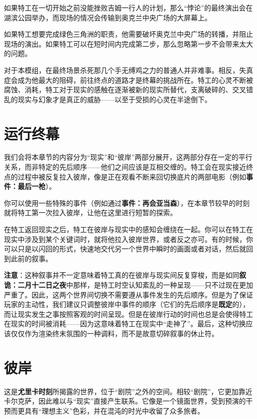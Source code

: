 如果特工在一切开始之前没能挫败吉姆一行人的计划，那么“悖论”的最终演出会在湖滨公园举办，而现场的情况会传输到奥克兰中央广场的大屏幕上。

如果特工想要完成绿色三角洲的职责，他需要破坏奥克兰中央广场的转播，并阻止现场的演出。如果特工可以在短时间内完成第二步，那么忽略第一步不会带来太大的问题。

对于本模组，在最终场景杀死那几个手无缚鸡之力的普通人并非难事。相反，失真症会成为他最大的阻碍，前往终点的道路才是终幕的挑战所在。特工的心灵不断被腐蚀、消耗，特工对于现实的感触在逐渐被新的现实所替代，支离破碎的、交叉错乱的现实与幻象才是真正的威胁——以至于受损的心灵在半途倒下。

\section{运行终幕}

我们会将本章节的内容分为“现实”和“彼岸”两部分展开，这两部分存在一定的平行关系，而非特定的先后顺序——他们之间应该是互相交缠的。特工会在现实接近终点的过程中被反复拉入彼岸，像是正在观看不断来回切换底片的两部电影（例如\textbf{事件：最后一枪}）。

你可以使用一些特殊的事件（例如通过\textbf{事件：再会亚当森}），在本章节较早的时刻就将特工第一次拉入彼岸，让他在这里进行短暂的探索。

在特工返回现实之后，特工在彼岸与现实中的感知会缠绕在一起。你可以在特工在现实中涉及到某个关键词时，就将他拉入彼岸世界，或者反之亦可。有的时候，你可以只是以闪回的形式，快速地交代另一个世界中瞬时的画面或者对话，然后就回到此前的叙事。

\textbf{注意}：这种叙事并不一定意味着特工真的在彼岸与现实间反复穿梭，而是如同\textbf{叙诡：二月十二日之夜}中那样，是特工时空认知紊乱的一种呈现——只不过现在更加严重了。因此，这两个世界间切换不需要遵从事件发生的先后顺序。但是为了保证玩家的主动性，我们建议只调整彼岸中事件的顺序（它们的先后顺序是\textbf{既定}的），而让现实发生之事按照客观的时间呈现。但是在彼岸行动的时间也总是会使得特工在现实的时间被消耗——因为这意味着特工在现实中“走神了”。最后，这种切换应该仅仅作为渲染终末氛围的一种调料，而不是故意切碎叙事的休止符。

\section{彼岸}

这是\textbf{尤里卡时刻}所揭露的世界，位于“剧院”之外的空间。相较“剧院”，它更加靠近卡尔克萨，因此难以与“现实”直接产生联系。它像是一个镜面世界，受到预演的干预而更具有“理想主义”色彩，并在混沌的时光中收留了众多旅者。

